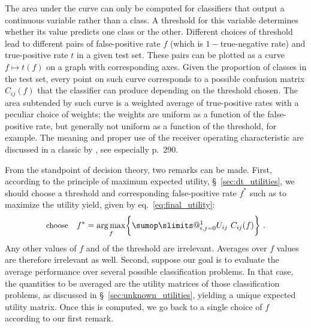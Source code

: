 \documentclass[\ifafour a4paper,12pt,\else a5paper,10pt,\fi%
onecolumn,oneside,article,%
british%
]{memoir}
\makeatletter
\theoremstyle{remark}
\theoremstyle{innote}
\def\sum{\DOTSI\sumop\slimits@}
\DeclarePairedDelimiter\set{\{}{\}} %
\renewcommand*{\|}[1][]{\nonscript\:#1\vert\nonscript\:\mathopen{}}
\newcommand*{\sect}{\S}%
\newcommand*{\eqn}{eq.}%
\DeclareMathOperator*{\argmax}{arg\,max}
\makeatother
\begin{document}
The area under the curve can only be computed for classifiers that output a continuous variable rather than a class. A threshold for this variable determines whether its value predicts one class or the other. Different choices of threshold lead to different pairs of false-positive rate $f$ (which is $1-{}$true-negative rate) and true-positive rate $t$ in a given test set. These pairs can be plotted as a curve $f \mapsto t(f)$ on a graph with corresponding axes. Given the proportion of classes in the test set, every point on such curve corresponds to a possible confusion matrix $C_{ij}(f)$ that the classifier can produce depending on the threshold chosen. The area subtended by such curve is a weighted average of true-positive rates with a peculiar choice of weights; the weights are uniform as a function of the false-positive rate, but generally not uniform as a function of the threshold, for example. The meaning and proper use of the receiver operating characteristic are discussed in a classic by \cites{metz1978}, see especially p.~290.


\medskip

From the standpoint of decision theory, two remarks can be made\autocites[similar points are made by][]{bakeretal2001,loboetal2008}. First, according to the principle of maximum expected utility, \sect~\ref{sec:dt_utilities}, we should choose a threshold and corresponding false-positive rate $f^{*}$ such as to maximize the utility yield, given by \eqn~\eqref{eq:final_utility}:
\begin{equation}
  \label{eq:threshold_auc_maxutility}
  \text{\small choose}\quad
  f^{*} = \argmax_{f}\set[\bigg]{\sum_{i,j=0}^{1} U_{ij}\ C_{ij}(f)} \ .
\end{equation}
Any other values of $f$ and of the threshold are irrelevant. Averages over $f$ values are therefore irrelevant as well. Second, suppose our goal is to evaluate the average performance over several possible classification problems. In that case, the quantities to be averaged are the utility matrices of those classification problems, as discussed in \sect~\ref{sec:unknown_utilities}, yielding a unique expected utility matrix. Once this is computed, we go back to a single choice of $f$ according to our first remark.
\end{document}

